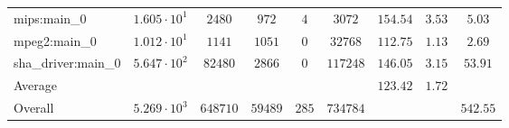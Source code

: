 \begin{tabular}{|l|c|c|c|c|c|c|c|c|}
mips:main\_0            & $ 1.605 \cdot 10^{1}  $ & $ 2480   $ & $ 972   $ & $ 4   $ & $ 3072   $ & $ 154.54      $ & $ 3.53    $ & $ 5.03    $ \\
mpeg2:main\_0           & $ 1.012 \cdot 10^{1}  $ & $ 1141   $ & $ 1051  $ & $ 0   $ & $ 32768  $ & $ 112.75      $ & $ 1.13    $ & $ 2.69    $ \\
sha\_driver:main\_0     & $ 5.647 \cdot 10^{2}  $ & $ 82480  $ & $ 2866  $ & $ 0   $ & $ 117248 $ & $ 146.05      $ & $ 3.15    $ & $ 53.91   $ \\
\hline
Average                 & $                     $ & $        $ & $       $ & $     $ & $        $ & $ 123.42      $ & $ 1.72    $ & $         $ \\
\hline
Overall                 & $ 5.269 \cdot 10^{3}  $ & $ 648710 $ & $ 59489 $ & $ 285 $ & $ 734784 $ & $             $ & $         $ & $ 542.55  $ \\
\hline
\end{tabular}
